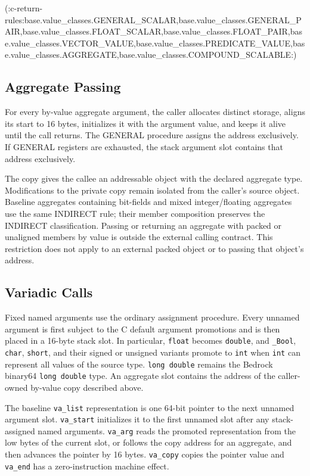 \documentclass[10pt,twoside]{article}
\begin{document}
(:c-return-rules:base.value_classes.GENERAL_SCALAR,base.value_classes.GENERAL_PAIR,base.value_classes.FLOAT_SCALAR,base.value_classes.FLOAT_PAIR,base.value_classes.VECTOR_VALUE,base.value_classes.PREDICATE_VALUE,base.value_classes.AGGREGATE,base.value_classes.COMPOUND_SCALABLE:)

\subsection{Aggregate Passing}
For every by-value aggregate argument, the caller allocates distinct storage,
aligns its start to 16 bytes, initializes it with the argument value, and keeps
it alive until the call returns. The GENERAL procedure assigns the address
exclusively. If GENERAL registers are exhausted, the
stack argument slot contains that address exclusively.

The copy gives the callee an addressable object with the declared aggregate
type. Modifications to the private copy remain isolated from the caller's
source object. Baseline aggregates containing bit-fields and mixed
integer/floating aggregates use the same INDIRECT rule; their member
composition preserves the INDIRECT classification. Passing or returning an
aggregate with packed or unaligned members by value is outside the external
calling contract. This restriction does not apply to an external packed object
or to passing that object's address.

\subsection{Variadic Calls}
Fixed named arguments use the ordinary assignment procedure. Every unnamed
argument is first subject to the C default argument promotions and is then
placed in a 16-byte stack slot. In particular, \texttt{float} becomes
\texttt{double}, and \texttt{\_Bool}, \texttt{char}, \texttt{short}, and their
signed or unsigned variants promote to \texttt{int} when \texttt{int} can
represent all values of the source type. \texttt{long double} remains the
Bedrock binary64 \texttt{long double} type. An aggregate slot contains the
address of the caller-owned by-value copy described above.

The baseline \texttt{va\_list} representation is one 64-bit pointer to the next
unnamed argument slot. \texttt{va\_start} initializes it to the first unnamed
slot after any stack-assigned named arguments. \texttt{va\_arg} reads the
promoted representation from the low bytes of the current slot, or follows the
copy address for an aggregate, and then advances the pointer by 16 bytes.
\texttt{va\_copy} copies the pointer value and \texttt{va\_end} has a
zero-instruction machine effect.
\end{document}
